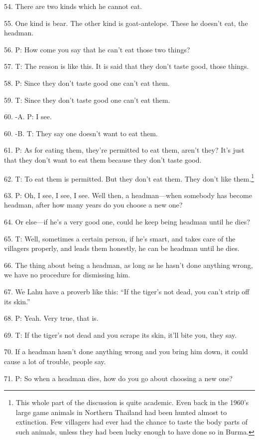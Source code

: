 54. There are two kinds which he cannot eat.

55. One kind is bear. The other kind is goat-antelope. These he doesn't eat, the
headman.

56. P: How come you say that he can't eat those two things?

57. T: The reason is like this. It is said that they don't taste good, those things.

58. P: Since they don't taste good one can't eat them.

59. T: Since they don't taste good one can't eat them.

60. -A. P: I see.

60. -B. T: They say one doesn't want to eat them.

61. P: As for eating them, they're permitted to eat them, aren't they? It's just
that they don't want to eat them because they don't taste good.

62. T: To eat them is permitted. But they don't eat them. They don't like them.\footnote{This whole part of the discussion is quite academic. Even back in the 1960's large game animals in Northern Thailand had been hunted almost to extinction. Few villagers had ever had the chance to taste the body parts of such animals, unless they had been lucky enough to have done so in Burma.}

63. P: Oh, I see, I see, I see. Well then, a headman---when somebody has become
headman, after how many years do you choose a new one?

64. Or else---if he's a very good one, could he keep being headman until he dies?

65. T: Well, sometimes a certain person, if he's smart, and takes care of the villagers
properly, and leads them honestly, he can be headman until he dies.

66. The thing about being a headman, as long as he hasn't done anything wrong,
we have no procedure for dismissing him.

67. We Lahu have a proverb like this: ``If the tiger's not dead, you can't strip
off its skin.''

68. P: Yeah. Very true, that is.

69. T: If the tiger's not dead and you scrape its skin, it'll bite you, they say.

70. If a headman hasn't done anything wrong and you bring him down, it could cause
a lot of trouble, people say.

71. P: So when a headman dies, how do you go about choosing a new one?

